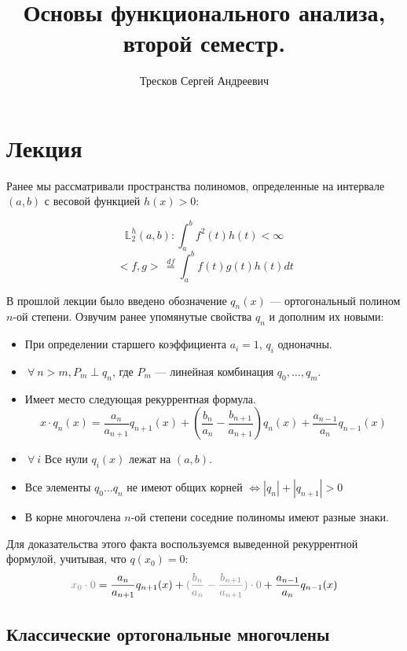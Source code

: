 \documentclass[12pt]{article}
\let\foralltemp\forall
\renewcommand{\forall}{\: \foralltemp \:}
\newcommand{\scal}[2]{\, < \!\! #1, #2 \!\! > \,}
\begin{document}
	\title{Основы функционального анализа, второй семестр.}
	\author{Тресков Сергей Андреевич}
	\maketitle
	
	\section{Лекция}
	
	Ранее мы рассматривали пространства полиномов, определенные на интервале $(a, b)$ с весовой функцией $h(x) > 0$:
	
	$$\mathbb{L}_2^h (a, b): \int_a^b f^2(t) h(t) < \infty$$
	$$\scal{f}{g} \overset{df}{=} \int_a^b f(t) g(t) h(t) dt$$
	
	В прошлой лекции было введено обозначение $q_n(x)$ --- ортогональный полином $n$-ой степени. Озвучим ранее упомянутые
	свойства $q_n$ и дополним их новыми:
	
	\begin{itemize}
		\item При определении старшего коэффициента $a_i = 1$, $q_i$ одноначны.
		\item $\forall n > m, P_m \perp q_n$, где $P_m$ --- линейная комбинация $q_0, \dots , q_m$.
		\item Имеет место следующая рекуррентная формула.
		$$x \cdot q_n(x) = 
		\frac{a_n}{a_{n+1}} q_{n+1}(x) + (\frac{b_n}{a_n} - \frac{b_{n+1}}{a_{n+1}}) q_n(x) + \frac{a_{n-1}}{a_n} q_{n-1}(x)$$
		\item $\forall i$ Все нули $q_i(x)$ лежат на $(a, b)$.
		\item Все элементы $q_0 \dots q_n$ не имеют общих корней $\Leftrightarrow |q_n| + |q_{n+1}| > 0$
		\item В корне многочлена $n$-ой степени соседние полиномы имеют разные знаки.
	\end{itemize}
	
	Для доказательства этого факта воспользуемся выведенной рекуррентной формулой, учитывая, что $q(x_0) = 0$:
	$$ {\color{gray}x_0 \cdot 0} = 
	\frac{a_n}{a_{n+1}} q_{n+1}(x) + {\color{gray}(\frac{b_n}{a_n} - \frac{b_{n+1}}{a_{n+1}}) \cdot 0} + \frac{a_{n-1}}{a_n} q_{n-1}(x)$$
		
	
	\subsection*{Классические ортогональные многочлены}
\end{document}
